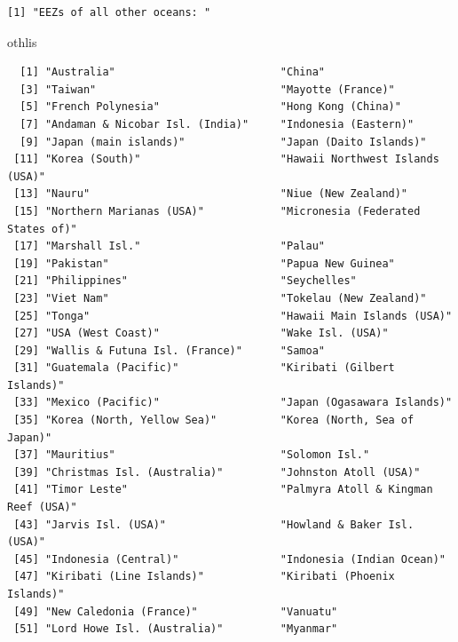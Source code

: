 \documentclass[
]{article}
\newenvironment{Shaded}{\begin{snugshade}}{\end{snugshade}}
\newcommand{\NormalTok}[1]{\textcolor[rgb]{0.00,0.23,0.31}{#1}}
\begin{document}
\begin{verbatim}
[1] "EEZs of all other oceans: "
\end{verbatim}

\begin{Shaded}
\begin{Highlighting}[]
\NormalTok{othlis}
\end{Highlighting}
\end{Shaded}

\begin{verbatim}
  [1] "Australia"                          "China"                             
  [3] "Taiwan"                             "Mayotte (France)"                  
  [5] "French Polynesia"                   "Hong Kong (China)"                 
  [7] "Andaman & Nicobar Isl. (India)"     "Indonesia (Eastern)"               
  [9] "Japan (main islands)"               "Japan (Daito Islands)"             
 [11] "Korea (South)"                      "Hawaii Northwest Islands (USA)"    
 [13] "Nauru"                              "Niue (New Zealand)"                
 [15] "Northern Marianas (USA)"            "Micronesia (Federated States of)"  
 [17] "Marshall Isl."                      "Palau"                             
 [19] "Pakistan"                           "Papua New Guinea"                  
 [21] "Philippines"                        "Seychelles"                        
 [23] "Viet Nam"                           "Tokelau (New Zealand)"             
 [25] "Tonga"                              "Hawaii Main Islands (USA)"         
 [27] "USA (West Coast)"                   "Wake Isl. (USA)"                   
 [29] "Wallis & Futuna Isl. (France)"      "Samoa"                             
 [31] "Guatemala (Pacific)"                "Kiribati (Gilbert Islands)"        
 [33] "Mexico (Pacific)"                   "Japan (Ogasawara Islands)"         
 [35] "Korea (North, Yellow Sea)"          "Korea (North, Sea of Japan)"       
 [37] "Mauritius"                          "Solomon Isl."                      
 [39] "Christmas Isl. (Australia)"         "Johnston Atoll (USA)"              
 [41] "Timor Leste"                        "Palmyra Atoll & Kingman Reef (USA)"
 [43] "Jarvis Isl. (USA)"                  "Howland & Baker Isl. (USA)"        
 [45] "Indonesia (Central)"                "Indonesia (Indian Ocean)"          
 [47] "Kiribati (Line Islands)"            "Kiribati (Phoenix Islands)"        
 [49] "New Caledonia (France)"             "Vanuatu"                           
 [51] "Lord Howe Isl. (Australia)"         "Myanmar"                           

\end{verbatim}
\end{document}
